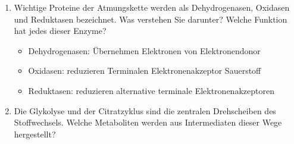 \begin{enumerate}
	\item Wichtige Proteine der Atmungskette werden als Dehydrogenasen, Oxidasen und Reduktasen bezeichnet. Was verstehen Sie darunter? Welche Funktion hat jedes dieser Enzyme?
		\begin{itemize}
			\item Dehydrogenasen: \"Ubernehmen Elektronen von Elektronendonor
			\item Oxidasen: reduzieren Terminalen Elektronenakzeptor Sauerstoff
			\item Reduktasen: reduzieren alternative terminale Elektronenakzeptoren
		\end{itemize}
	\item Die Glykolyse und der Citratzyklus sind die zentralen Drehscheiben des Stoffwechsels. Welche Metaboliten werden aus Intermediaten dieser Wege hergestellt?
\end{enumerate}
